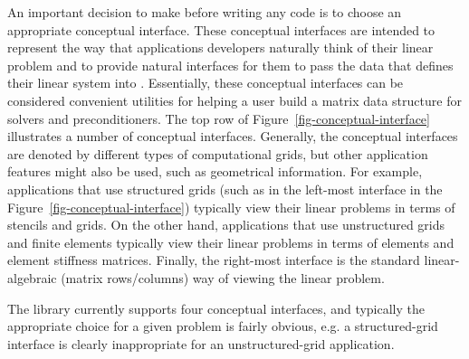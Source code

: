 An important decision to make before writing any code is to choose an
appropriate conceptual interface.  These conceptual interfaces are
intended to represent the way that applications developers naturally
think of their linear problem and to provide natural interfaces for them
to pass the data that defines their linear system into \hypre{}.
Essentially, these conceptual interfaces can be considered convenient
utilities for helping a user build a matrix data structure for
\hypre{} solvers and preconditioners.  The top row of
Figure~\ref{fig-conceptual-interface} illustrates a number of
conceptual interfaces.  Generally, the conceptual interfaces are
denoted by different types of computational grids, but other
application features might also be used, such as geometrical
information.  For example, applications that use structured grids
(such as in the left-most interface in the
Figure~\ref{fig-conceptual-interface}) typically view their linear
problems in terms of stencils and grids.  On the other hand,
applications that use unstructured grids and finite elements typically
view their linear problems in terms of elements and element stiffness
matrices. Finally, the right-most interface is the standard
linear-algebraic (matrix rows/columns) way of viewing the linear
problem.

The \hypre{} library currently supports four conceptual interfaces,
and typically the appropriate choice for a given problem is fairly
obvious, e.g. a structured-grid interface is clearly inappropriate for
an unstructured-grid application.


